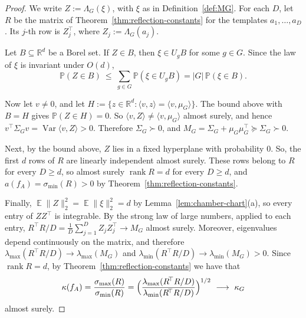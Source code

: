 \documentclass[11pt]{article}
\newcommand{\R}{\mathbb{R}}
\newcommand{\inner}[2]{\langle #1, #2 \rangle}
\theoremstyle{definition}
\DeclareMathOperator{\EX}{\mathbb{E}}
\begin{document}
\begin{proof}
	We write $Z:=\Lambda_G(\xi)$, with $\xi$ as in Definition~\ref{def:MG}. For each $D$, let
	$R$ be the matrix of Theorem~\ref{thm:reflection-constants} for the templates
	$a_1,\dots,a_D$. Its $j$-th row is $Z_j^{\!\top}$, where $Z_j:=\Lambda_G(a_j)$.

	Let $B\subseteq\R^d$ be a Borel set. If $Z\in B$, then $\xi\in U_gB$ for some $g\in G$. Since the law of
	$\xi$ is invariant under $O(d)$,
	\[
	\mathbb{P}(Z\in B)\ \le\ \sum_{g\in G}\mathbb{P}(\xi\in U_gB)=|G|\,\mathbb{P}(\xi\in B).
	\]

Now let $v\neq0$, and let $H:=\{z\in\R^d:\inner{v}{z}=\inner{v}{\mu_G}\}$. The bound above with
$B=H$ gives $\mathbb{P}(Z\in H)=0$. So $\inner{v}{Z}\neq\inner{v}{\mu_G}$ almost surely, and
hence $v^{\!\top}\Sigma_Gv=\operatorname{Var}\inner{v}{Z}>0$. Therefore $\Sigma_G\succ0$, and
$M_G=\Sigma_G+\mu_G\mu_G^{\!\top}\succeq\Sigma_G\succ0$.

	Next, by the bound above, $Z$ lies in a fixed hyperplane with probability $0$.  So, the first $d$ rows of $R$ are linearly
	independent almost surely. These rows belong to $R$ for every $D\ge d$, so almost surely
	$\operatorname{rank}R=d$ for every $D\ge d$, and $a(f_A)=\sigma_{\min}(R)>0$ by
	Theorem~\ref{thm:reflection-constants}.

	Finally, $\EX\|Z\|_2^2=\EX\|\xi\|_2^2=d$ by Lemma~\ref{lem:chamber-chart}(a), so every
	entry of $ZZ^{\!\top}$ is integrable. By the strong law of large numbers, applied to each
	entry, $R^{\!\top}R/D=\frac1D\sum_{j=1}^DZ_jZ_j^{\!\top}\to M_G$ almost surely. Moreover, eigenvalues depend continuously on
	the matrix, and therefore $\lambda_{\max}(R^{\!\top}R/D)\to\lambda_{\max}(M_G)$ and
	$\lambda_{\min}(R^{\!\top}R/D)\to\lambda_{\min}(M_G)>0$. Since $\operatorname{rank}R=d$,
	by Theorem~\ref{thm:reflection-constants} we have that 
	\[
	\kappa(f_A)=\frac{\sigma_{\max}(R)}{\sigma_{\min}(R)}
	=\Bigl(\frac{\lambda_{\max}(R^{\!\top}R/D)}{\lambda_{\min}(R^{\!\top}R/D)}\Bigr)^{1/2}
	\ \longrightarrow\ \kappa_G 
	\]
	almost surely.
\end{proof}


 
\end{document}

